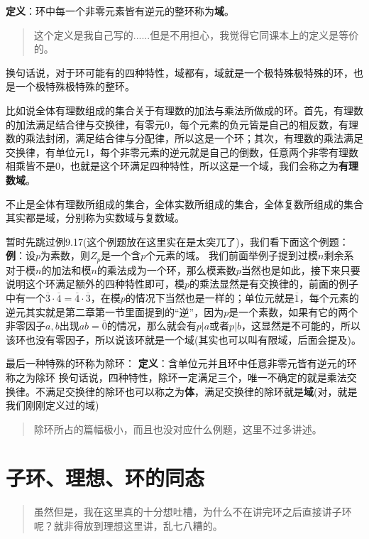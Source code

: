 \documentclass[12pt, a4paper, oneside]{ctexart}
\newenvironment{myquote}{\begin{quote}\small\color{gray}}{\end{quote}}
\begin{document}
\textbf{定义}：环中每一个非零元素皆有逆元的整环称为\textbf{域}。

\begin{myquote}
这个定义是我自己写的......但是不用担心，我觉得它同课本上的定义是等价的。
\end{myquote}

换句话说，对于环可能有的四种特性，域都有，域就是一个极特殊极特殊的环，也是一个极特殊极特殊的整环。

比如说全体有理数组成的集合关于有理数的加法与乘法所做成的环。首先，有理数的加法满足结合律与交换律，有零元0，每个元素的负元皆是自己的相反数，有理数的乘法封闭，满足结合律与分配律，所以这是一个环；其次，有理数的乘法满足交换律，有单位元1，每个非零元素的逆元就是自己的倒数，任意两个非零有理数相乘皆不是0，也就是这个环满足四种特性，所以这是一个域，我们会称之为\textbf{有理数域}。

不止是全体有理数所组成的集合，全体实数所组成的集合，全体复数所组成的集合其实都是域，分别称为实数域与复数域。

暂时先跳过例9.17(这个例题放在这里实在是太突兀了)，我们看下面这个例题：
\textbf{例}：设$p$为素数，则$Z_p$是一个含$p$个元素的域。
我们前面举例子提到过模$n$剩余系对于模$n$的加法和模$n$的乘法成为一个环，那么模素数$p$当然也是如此，接下来只要说明这个环满足额外的四种特性即可，模$p$的乘法显然是有交换律的，前面的例子中有一个$\overline{3}\cdot\overline{4}=\overline{4}\cdot\overline{3}$，在模$p$的情况下当然也是一样的；单位元就是$\overline{1}$，每个元素的逆元其实就是第二章第一节里面提到的“逆”，因为$p$是一个素数，如果有它的两个非零因子$a,b$出现$ab=\overline{0}$的情况，那么就会有$p|a$或者$p|b$，这显然是不可能的，所以该环也没有零因子，所以说该环就是一个域(其实也可以叫有限域，后面会提及)。

最后一种特殊的环称为除环：
\textbf{定义}：含单位元并且环中任意非零元皆有逆元的环称之为除环
换句话说，四种特性，除环一定满足三个，唯一不确定的就是乘法交换律。不满足交换律的除环也可以称之为\textbf{体}，满足交换律的除环就是\textbf{域}(对，就是我们刚刚定义过的域)

\begin{myquote}
除环所占的篇幅极小，而且也没对应什么例题，这里不过多讲述。
\end{myquote}

\section{子环、理想、环的同态}

\begin{myquote}
虽然但是，我在这里真的十分想吐槽，为什么不在讲完环之后直接讲子环呢？就非得放到理想这里讲，乱七八糟的。
\end{myquote}
\end{document}
